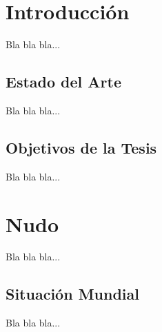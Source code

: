 \documentclass[a4paper,openright,12pt]{book}
\begin{document}

\chapter{Introducción}\label{cap.intro}

Bla bla bla...

\section{Estado del Arte}


Bla bla bla...

\section{Objetivos de la Tesis}

Bla bla bla...

\chapter{Nudo}\label{cap.nudo}

Bla bla bla...

\section{Situación Mundial}

Bla bla bla...
\end{document}
